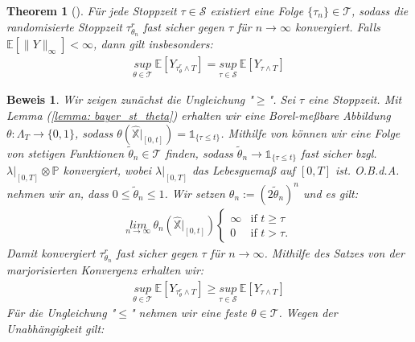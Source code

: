 \documentclass[12pt,titlepage,headsepline]{article}
\newtheorem*{theorem-non}{Theorem}
\newtheorem*{beweis-non}{Beweis}
\begin{document}
      \begin{theorem-non}[\cite{bayer_optimal_2020,Prop. 4.2}]
        Für jede Stoppzeit $\tau \in \mathcal{S}$ existiert eine Folge $\{\tau_n\} \in \mathcal{T}$, sodass die randomisierte Stoppzeit $\tau^{r}_{\theta_n}$ fast sicher gegen $\tau$ für $n \rightarrow \infty$ konvergiert. Falls $\mathbb{E}[\lVert Y\rVert_\infty]<\infty$, dann gilt insbesonders:
        \begin{align*}
          \underset{\theta \in \mathcal{T}}{sup} \ \mathbb{E}[Y_{\tau^{r}_{\theta}\land T}] = \underset{\tau \in \mathcal{S}}{sup} \ \mathbb{E}[Y_{\tau \land T}]
        \end{align*}
      \end{theorem-non}
      \begin{beweis-non}
        \textup{
        Wir zeigen zunächst die Ungleichung "$\geq$". Sei $\tau$ eine Stoppzeit. Mit Lemma (\ref{lemma: bayer_st_theta}) erhalten wir eine Borel-meßbare Abbildung $\theta: \Lambda_T \rightarrow \{0,1\}$, sodass $\theta(\hat{\mathbb{X}}\rvert_{[0,t]})=\mathds{1}_{\{\tau \leq t\}}$. Mithilfe von \cite{wisniewski_structure_1992, Theorem 1} können wir eine Folge von stetigen Funktionen $\tilde{\theta}_n \in \mathcal{T}$ finden, sodass $\tilde{\theta}_n \rightarrow \mathds{1}_{\{\tau \leq t\}}$ fast sicher bzgl. $\lambda\lvert_{[0,T]}\otimes \mathbb{P}$ konvergiert, wobei $\lambda\lvert_{[0,T]}$ das Lebesguemaß auf $[0,T]$ ist. O.B.d.A. nehmen wir an, dass $0 \leq \tilde{\theta}_n \leq 1$. Wir setzen $\theta_n := (2\tilde{\theta}_n)^n$ und es gilt:
        \begin{align*}
          \underset{n \rightarrow \infty}{lim} \ \theta_n(\hat{\mathbb{X}}\rvert_{[0,t]})
          \begin{cases}
            \infty & \text{if } t \geq \tau \\
            0 & \text{if } t > \tau.
          \end{cases}
        \end{align*}
        Damit konvergiert $\tau_{\theta_n}^r$ fast sicher gegen $\tau$ für $n \rightarrow \infty$. Mithilfe des Satzes von der marjorisierten Konvergenz erhalten wir:
        \begin{align*}
          \underset{\theta \in \mathcal{T}}{sup} \ \mathbb{E}[Y_{\tau_{\theta}^r\land T}] \geq \underset{\tau \in \mathcal{S}}{sup} \ \mathbb{E}[Y_{\tau \land T}]
        \end{align*}
        Für die Ungleichung "$\leq$" nehmen wir eine feste $\theta \in \mathcal{T}$. Wegen der Unabhängigkeit gilt:
}
\end{beweis-non}
\end{document}
